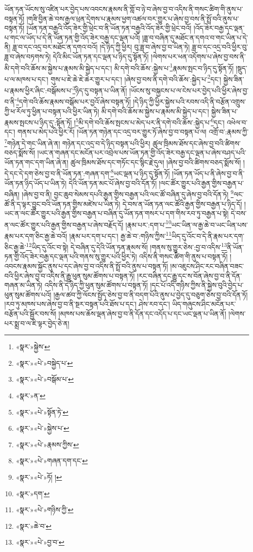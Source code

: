 ཡོན་ཏན་ཡོངས་སུ་འཛིན་པར་བྱེད་པས་འབངས་རྣམས་ནི་གློ་བ་ཉེ་བ་ཞེས་བྱ་བ་འདིས་ནི་གསང་ཚིག་གི་ནུས་པ་བསྟན་ཏོ། །གཟི་བྱིན་ཆེ་བས་རྒྱལ་ཕྲན་དྲེགས་པ་རྣམས་ཕྱག་འཚལ་བར་གྱུར་པ་ཞེས་བྱ་བས་ནི་སྤྲོ་བའི་ནུས་པ་བསྟན་ཏོ། །ཡོན་ཏན་བརྒྱའི་འོད་ཟེར་གྱི་ཕྲེང་བ་ནི་ཡོན་ཏན་བརྒྱའི་འོད་ཟེར་གྱི་ཕྲེང་བའོ། །འོད་ཟེར་བརྒྱ་དང་ལྡན་པ་གང་ལ་ཡོད་པ་དེ་ནི་ཡོན་ཏན་གྱི་འོད་ཟེར་བརྒྱ་དང་ལྡན་པའོ། །ཟླ་བ་བཞིན་དུ་མཐོང་ན་དགའ་བ་གང་ཡིན་པ་དེ་ནི། ཟླ་བ་དང་འདྲ་བར་མཐོང་ན་དགའ་བའོ། །དེ་ཉིད་ཀྱི་ཕྱིར། བུ་ཟླ་བ་ཞེས་བྱ་བ་ཡིན་ཏེ། ཟླ་བ་དང་འདྲ་བའི་ཕྱིར་བུ་ཟླ་བ་ཞེས་བཏགས་ཏེ། དེའི་མིང་ཡོན་ཏན་དང་ལྡན་པ་ཉིད་དུ་སྟོན་ཏོ། །ལེགས་པར་ཕན་འདོགས་པ་ཞེས་བྱ་བས་ནི་མི་དགེ་བའི་ཆོས་མ་སྐྱེས་པ་རྣམས་མི་སྐྱེད་པ་དང་། མི་དགེ་བའི་ཆོས་:སྐྱེས་པ་\footnote{«སྣར་»སྐྱེས་}རྣམས་སྤང་བ་ཉིད་དུ་སྟོན་ཏོ། །སྡུད་པ་ལ་མཁས་པ་དང་། གུས་པ་ཇེ་ཆེ་ཇེ་ཆེར་གྱུར་པ་དང་། །ཞེས་བྱ་བས་ནི་དགེ་བའི་ཆོས་:སྐྱེད་པ་\footnote{«སྣར་»«པེ་»བསྐྱེད་པ་}དང་། སྐྱེས་ཟིན་པ་རྣམས་ཕྱིར་ཞིང་:བསྒོམས་པ་\footnote{«སྣར་»«པེ་»བསྒོམ་པ་}ཉིད་དུ་བསྟན་པ་ཡིན་ནོ། །ཡོངས་སུ་བསྐྱངས་པ་ལ་ངེས་པར་བྱེད་པའི་ཕྱིར་ཞེས་བྱ་བ་ནི་\footnote{«སྣར་»ན་}དགེ་བའི་ཆོས་རྣམས་བསྒོམ་པར་བྱའོ་ཞེས་བསྟན་ཏོ། །དེ་ཉིད་ཀྱི་ཕྱིར་སྐྱེས་པའི་རབས་འདི་ནི་བརྩོན་འགྲུས་ཀྱི་ཕ་རོལ་ཏུ་ཕྱིན་པ་བསྟན་པའི་ཕྱིར་ཡིན་ཏེ། མི་དགེ་བའི་ཆོས་མ་སྐྱེས་པ་རྣམས་མི་སྐྱེད་པ་དང་། སྐྱེས་ཟིན་པ་རྣམས་སྤངས་པ་ཉིད་དུ་:སྟོན་ཏོ། །\footnote{«སྣར་»«པེ་»སྟོན་ཏེ་}མི་དགེ་བའི་ཆོས་སྤངས་པ་མེད་པར་ནི་དགེ་བའི་ཆོས་:སྐྱེད་པ་\footnote{«སྣར་»«པེ་»སྐྱེས་པ་}དང་། འཕེལ་བ་དང་། གནས་པ་མེད་པའི་ཕྱིར་རོ། །ཡོན་ཏན་གཉེན་དང་འདྲ་བར་གྱུར་ཏོ་ཞེས་བྱ་བ་བསྟན་པ་ལ། འགྲོ་བ་:རྣམས་ཀྱི་\footnote{«སྣར་»«པེ་»རྣམས་ཀྱིས་}གཉེན་དེ་གང་ཡིན་ཞེ་ན། གཉེན་དང་འདྲ་བ་དེ་ཉིད་བསྟན་པའི་ཕྱིར། ཚུལ་ཁྲིམས་ཐོས་དང་ཞེས་བྱ་བའི་ཚིགས་བཅད་སྨོས་སོ། །ཡང་ན་གཞན་དང་མངོན་པར་འབྲེལ་པས་ཡོན་ཏན་གྱི་འོད་ཟེར་བརྒྱ་དང་ལྡན་པ་ཞེས་བཤད་པའི་ཡོན་ཏན་གང་དག་ཡིན་ཞེ་ན། ཚུལ་ཁྲིམས་ཐོས་དང་གཏོང་དང་སྙིང་རྗེ་དུལ། །ཞེས་བྱ་བའི་ཚིགས་བཅད་སྨོས་སོ། །དེ་དང་དེ་དག་ཅེས་བྱ་བ་ནི་ཡོན་ཏན་:གཞན་དག་\footnote{«སྣར་»«པེ་»གཞན་དག་དང་}ཡང་ལྡན་པ་ཉིད་དུ་སྟོན་ཏོ། །ཡོན་ཏན་ཡོད་པ་ནི་ཞེས་བྱ་བ་ནི་ཡོན་ཏན་ཉིད་ཡོད་པ་ཡིན་ཏེ། དེའི་ཡོན་ཏན་མང་པོ་ཞེས་བྱ་བའི་དོན་ཏོ། །ལང་ཚོར་གྱུར་པའི་རྒྱན་གྱིས་བརྒྱན་པ་བཞིན། །ཞེས་བྱ་བ་ནི། བྱང་ཆུབ་སེམས་དཔའི་རྒྱན་གྱིས་བརྒྱན་པའི་ལང་ཚོ་བཞིན་དུ་ཞེས་བྱ་བའི་དོན་ཏེ། \footnote{«སྣར་»«པེ་»ཏོ། ། }ལང་ཚོ་ནི་ད་ལྟར་བྱུང་བའི་ཡོན་ཏན་གྱིས་མཛེས་པ་ཡིན་ཏེ། དེ་བས་ན་ཡོན་ཏན་ལང་ཚོའི་རྒྱན་གྱིས་བརྒྱན་པ་ཉིད་དོ། །ཡང་ན་ལང་ཚོར་གྱུར་པའི་རྒྱན་གྱིས་བརྒྱན་པ་བཞིན་དུ་ཡོན་ཏན་གསར་པ་དག་གིས་རབ་ཏུ་བརྒྱན་པ་སྟེ། དེ་བས་ན་ལང་ཚོར་གྱུར་པའི་རྒྱན་གྱིས་བརྒྱན་པ་ཞེས་བརྗོད་དོ། །རྣམ་པར་:དག་པ་\footnote{«སྣར་»དག་}ཡང་ཡིན་ལ་རྒྱ་ཆེ་བ་ཡང་ཡིན་པས་རྣམ་པར་དག་ཅིང་རྒྱ་ཆེ་བའོ། །རྣམ་པར་དག་པ་དང་། རྒྱ་ཆེ་བ་:གཉིས་ཀྱིས་\footnote{«སྣར་»«པེ་»གཉིས་ཀྱི་}ཡིད་དུ་འོང་བ་དེ་ནི་རྣམ་པར་དག་ཅིང་རྒྱ་ཆེ་\footnote{«སྣར་»ཆེ་བ་}ཡིད་དུ་འོང་བ་སྟེ། དེ་བཞིན་དུ་དེའི་ཡོན་ཏན་རྣམས་སོ། །གནས་སུ་གྱུར་ཅེས་:བྱ་བ་འདིས་\footnote{«སྣར་»«པེ་»བྱ་བ་}ནི་ཡོན་ཏན་གྱི་འོད་ཟེར་བརྒྱ་དང་ལྡན་པའི་གནས་སུ་གྱུར་པའི་ཕྱིར་ཏེ། འདིས་ནི་གསང་ཚིག་གི་ནུས་པ་བསྟན་ཏོ། །འབངས་རྣམས་སྐྱོང་ནུས་པ་དང་ཞེས་བྱ་བ་འདིས་ནི་སྤྲོ་བའི་ནུས་པ་བསྟན་ཏོ། །མ་འཇུངས་ཤིང་རང་བཞིན་བཟང་བའི་ཕྱིར་ཞེས་བྱ་བ་འདིས་ནི་རྒྱུ་ཕུན་སུམ་ཚོགས་པ་བསྟན་ཏོ། །རང་བཞིན་དང་རྒྱུ་དང་ས་བོན་ཞེས་བྱ་བ་ནི་དོན་གཞན་མ་ཡིན་ཏེ། འདིས་ནི་དེ་ཉིད་ཀྱི་ཕུན་སུམ་ཚོགས་པ་བསྟན་ཏོ། །དང་པོ་འདི་གཉིས་ཀྱིས་ནི་སྐྱེས་བུའི་བྱེད་པ་ཕུན་སུམ་ཚོགས་པའོ། །རྒྱལ་ཚབ་ཀྱི་ལོངས་སྤྱོད་ཅེས་བྱ་བ་ནི་བདག་པོའི་ནུས་པ་བྱེད་དུ་བཅུག་ཅེས་བྱ་བའི་དོན་ཏོ། །རབ་ཏུ་མཁས་པས་ཞེས་བྱ་བ་ནི་སྔར་བསྟན་པའི་ཐོས་པ་དང་། ཤེས་རབ་དང་། ཡིད་གཞུངས་ཤིང་མངོན་པར་བརྩོན་པའི་སྦྱོར་བས་སོ། །མཁས་པས་ཆོས་ལྡན་ཞེས་བྱ་བ་ནི་དོན་དང་འདོད་པ་དང་ཡང་ལྡན་པ་ཡིན་ནོ། །ལེགས་པར་སྨྲ་བ་ལ་ཇི་ལྟར་བྱེད་ཅེ་ན། 